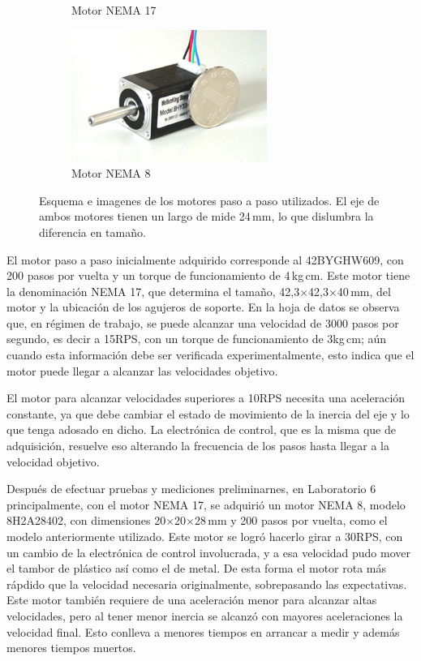 \begin{figure}[H]
\begin{subfigure}[b]{0.33\textwidth}
        \caption{Motor NEMA 17}
    \end{subfigure}
    \begin{subfigure}[b]{0.33\textwidth}
    \centering
        \includegraphics[width=0.7\textwidth]{fig/motor/nema8}
        \caption{Motor NEMA 8}
    \end{subfigure}
    \caption{Esquema e imagenes de los motores paso a paso utilizados. El eje de ambos motores tienen un largo de mide 24$\,$mm, lo que dislumbra la diferencia en tamaño.}
\end{figure}
El motor paso a paso inicialmente adquirido corresponde al 42BYGHW609\cite{42BYGHW609}, con 200 pasos por vuelta y un torque de funcionamiento de 4$\,$kg$\,$cm. Este motor tiene la denominación NEMA 17, que determina el tamaño, 42,3$\times$42,3$\times$40$\,$mm, del motor y la ubicación de los agujeros de soporte. En la hoja de datos se observa que, en régimen de trabajo, se puede alcanzar una velocidad de 3000 pasos por segundo, es decir a 15RPS, con un torque de funcionamiento de 3kg$\,$cm; aún cuando esta información debe ser verificada experimentalmente, esto indica que el motor puede llegar a alcanzar las velocidades objetivo. 

El motor para alcanzar velocidades superiores a 10RPS necesita una aceleración constante, ya que debe cambiar el estado de movimiento de la inercia del eje y lo que tenga adosado en dicho. La electrónica de control, que es la misma que de adquisición, resuelve eso alterando la frecuencia de los pasos hasta llegar a la velocidad objetivo.

Después de efectuar pruebas y mediciones preliminarnes, en Laboratorio 6 principalmente, con el motor NEMA 17, se adquirió un motor NEMA 8, modelo 8H2A28402\cite{8H2A28402}, con dimensiones 20$\times$20$\times$28$\,$mm y 200 pasos por vuelta, como el modelo anteriormente utilizado. Este motor se logró hacerlo girar a 30RPS, con un cambio de la electrónica de control involucrada, y a esa velocidad pudo mover el tambor de plástico así como el de metal. De esta forma el motor rota más rápdido que la velocidad necesaria originalmente, sobrepasando las expectativas. Este motor también requiere de una aceleración menor para alcanzar altas velocidades, pero al tener menor inercia se alcanzó con mayores aceleraciones la velocidad final. Esto conlleva a menores tiempos en arrancar a medir y además menores tiempos muertos.



